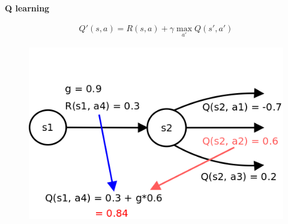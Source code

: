 \documentclass[xcolor=dvipsnames]{beamer}
\begin{document}
\begin{frame}{\bf Q learning}

\begin{align*}
Q'(s, a) = R(s, a) + \gamma \max \limits_{a'} Q(s', a')
\end{align*}

\begin{figure}
  \includegraphics[scale=0.3]{../../diagrams/q_learning_detail.png}
\end{figure}

\end{frame}
\end{document}
